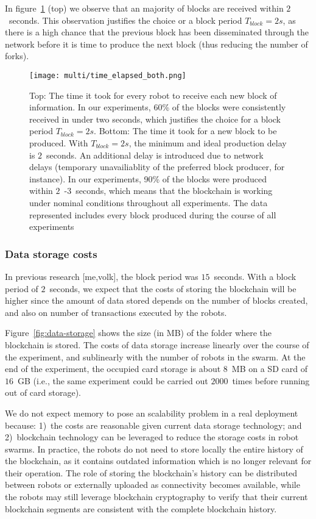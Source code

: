 \documentclass[runningheads]{llncs}
\begin{document}
 In figure~\ref{fig:block-histograms} (top) we observe that an majority of blocks are received within $2$~seconds. This observation justifies the choice or a block period $T_{block}=2s$, as there is a high chance that the previous block has been disseminated through the network before it is time to produce the next block (thus reducing the number of forks).

\begin{figure}
  \centering
  \texttt{[image: multi/time\_elapsed\_both.png]}
  \caption{Top: The time it took for every robot to receive each new block of information. In our experiments, 60\% of the blocks were consistently received in under two seconds, which justifies the choice for a block period $T_{block}=2s$. Bottom: The time it took for a new block to be produced. With $T_{block}=2s$, the minimum and ideal production delay is $2$~seconds. An additional delay is introduced due to network delays (temporary unavailiablity of the preferred block producer, for instance). In our experiments, 90\% of the blocks were produced within $2$~-$3$~seconds, which means that the blockchain is working under nominal conditions throughout all experiments. The data represented includes every block produced during the course of all experiments}
  \label{fig:block-histograms}
\end{figure}

\subsubsection{Data storage costs}

In previous research [me,volk], the block period was $15$~seconds. With a block period of $2$~seconds, we expect that the costs of storing the blockchain will be higher since the amount of data stored depends on the number of blocks created, and also on number of transactions executed by the robots. 

Figure~\ref{fig:data-storage} shows the size (in MB) of the folder where the blockchain is stored. The costs of data storage increase linearly over the course of the experiment, and sublinearly with the number of robots in the swarm. At the end of the experiment, the occupied card storage is about $8$~MB on a SD card of $16$~GB (i.e., the same experiment could be carried out $2000$~times before running out of card storage). 

We do not expect memory to pose an scalability problem in a real deployment because: 1)~the costs are reasonable given current data storage technology; and 2)~blockchain technology can be leveraged to reduce the storage costs in robot swarms. In practice, the robots do not need to store locally the entire history of the blockchain, as it contains outdated information which is no longer relevant for their operation. The role of storing the blockchain's history can be distributed between robots or externally uploaded as connectivity becomes available, while the robots may still leverage blockchain cryptography to verify that their current blockchain segments are consistent with the complete blockchain history.
\end{document}
